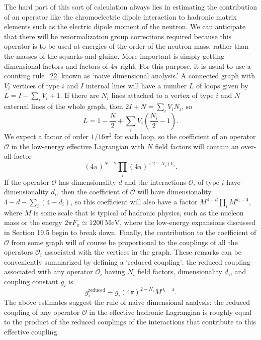 The hard part of this sort of calculation always lies in estimating the
contribution of an operator like the chromoelectric dipole interaction to
hadronic matrix elements such as the electric dipole moment of the
neutron. We can anticipate that there will be renormalization group
corrections required because this operator is to be used at energies of
the order of the neutron mass, rather than the masses of the squarks and
gluino. More important is simply getting dimensional factors and factors
of \(4\pi\) right. For this purpose, it is usual to use a counting
rule~\hyperref[ch28-ref-22]{[22]} known as `naive dimensional analysis.'
A connected graph with \(V_i\) vertices of type \(i\) and \(I\) internal
lines will have a number \(L\) of loops given by
\(L=I-\sum_iV_i+1\). If there are \(N_i\) lines attached to a vertex of
type \(i\) and \(N\) external lines of the whole graph, then
\(2I+N=\sum_iV_iN_i\), so
\[
  L=1-\frac{N}{2}
  +\sum_iV_i\left(\frac{N_i}{2}-1\right).
\]
We expect a factor of order \(1/16\pi^2\) for each loop, so the coefficient
of an operator \(\mathcal{O}\) in the low-energy effective Lagrangian with
\(N\) field factors will contain an over-all factor
\[
  (4\pi)^{N-2}
  \prod_i(4\pi)^{(2-N_i)V_i}.
\]
If the operator \(\mathcal{O}\) has dimensionality \(d\) and the
interactions \(\mathcal{O}_i\) of type \(i\) have dimensionality \(d_i\),
then the coefficient of \(\mathcal{O}\) will have dimensionality
\(4-d-\sum_i(4-d_i)\), so this coefficient will also have a factor
\(M^{4-d}\prod_iM^{d_i-4}\), where \(M\) is some scale that is typical
of hadronic physics, such as the nucleon mass or the energy
\(2\pi F_\pi\simeq1200\ \mathrm{MeV}\), where the low-energy expansions
discussed in Section 19.5 begin to break down. Finally, the contribution
to the coefficient of \(\mathcal{O}\) from some graph will of course be
proportional to the couplings of all the operators \(\mathcal{O}_i\)
associated with the vertices in the graph. These remarks can be
conveniently summarized by defining a `reduced coupling': the reduced
coupling associated with any operator \(\mathcal{O}_i\) having \(N_i\)
field factors, dimensionality \(d_i\), and coupling constant \(g_i\) is
\begin{equation}
  g_i^{\mathrm{reduced}}
  \equiv
  g_i(4\pi)^{2-N_i}M^{d_i-4}.
  \tag{28.4.16}\label{eq:28.4.16}
\end{equation}
The above estimates suggest the rule of naive dimensional analysis: the
reduced coupling of any operator \(\mathcal{O}\) in the effective hadronic
Lagrangian is roughly equal to the product of the reduced couplings of the
interactions that contribute to this effective coupling.

